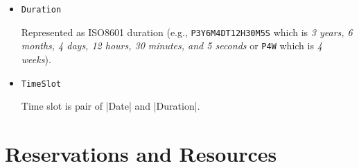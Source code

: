 \documentclass[a4paper]{report}
\newcommand{\APIcmd}[1]{%
\item \lstinline[style=myinline]!#1!%

}
\newenvironment{APIdef}{\begin{itemize}}{\end{itemize}}
\begin{document}
\begin{APIdef}
\paragraph{Note}: Apache XML-RPC can be easily extended for custom atomic types (e.g., \verb|dateTime| and \verb|periodicDateTime|) and these atomic types can be easily mapped to custom java classes (e.g., |Date| and |PeriodicDate|). These classes can also inherit one from the other. It was tested in \verb|rpc-test| application.

\APIcmd{Duration}
Represented as ISO8601 duration (e.g., \verb|P3Y6M4DT12H30M5S| which is \textit{3 years, 6 months, 4 days, 12 hours, 30 minutes, and 5 seconds} or \verb|P4W| which is \textit{4 weeks}).

\APIcmd{TimeSlot}
Time slot is pair of |Date| and |Duration|.

\end{APIdef}


\section{Reservations and Resources}
\end{document}
